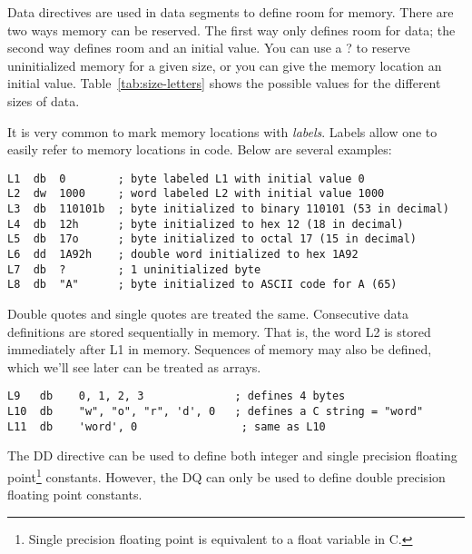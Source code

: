 Data directives are used in data segments to define room for
memory. There are two ways memory can be reserved. The first way only
defines room for data; the second way defines room and an initial
value. You can use a ? to reserve uninitialized memory for a given size,
or you can give the memory location an initial value.
Table~\ref{tab:size-letters} shows the possible
values for the different sizes of data.



It is very common to mark memory locations with
\emph{labels}.  Labels allow one to easily refer to
memory locations in code. Below are several examples:
\begin{lstlisting}[language={[x86masm]Assembler}]
L1  db  0        ; byte labeled L1 with initial value 0
L2  dw  1000     ; word labeled L2 with initial value 1000
L3  db  110101b  ; byte initialized to binary 110101 (53 in decimal)
L4  db  12h      ; byte initialized to hex 12 (18 in decimal)
L5  db  17o      ; byte initialized to octal 17 (15 in decimal)
L6  dd  1A92h    ; double word initialized to hex 1A92
L7  db  ?        ; 1 uninitialized byte
L8  db  "A"      ; byte initialized to ASCII code for A (65)
\end{lstlisting}

Double quotes and single quotes are treated the same. Consecutive data
definitions are stored sequentially in memory. That is, the word L2 is
stored immediately after L1 in memory. Sequences of memory may also be
defined, which we'll see later can be treated as arrays.
\begin{lstlisting}[language={[x86masm]Assembler}]
L9   db    0, 1, 2, 3              ; defines 4 bytes
L10  db    "w", "o", "r", 'd', 0   ; defines a C string = "word"
L11  db    'word', 0                ; same as L10
\end{lstlisting}

The {\code DD} directive can be used to define
both integer and single precision floating point\footnote{Single
precision floating point is equivalent to a {\code float} variable in
C.} constants. However, the {\code DQ} can only
be used to define double precision floating point constants.

